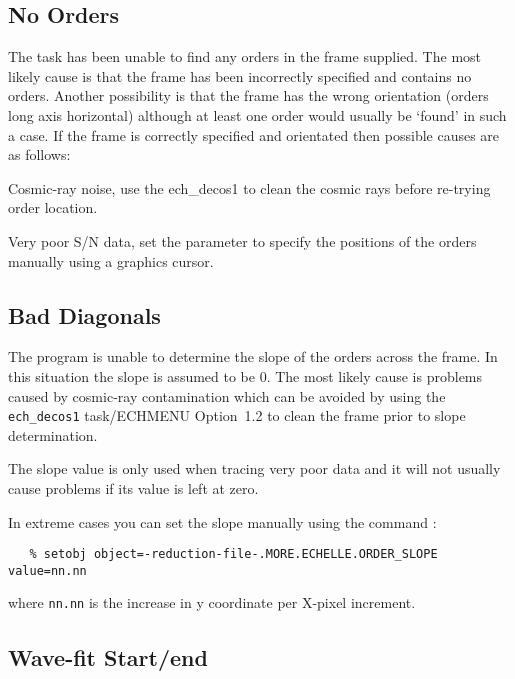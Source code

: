 \subsection{ No Orders}

The task has been unable to find any orders in the frame supplied. The
most likely cause is that the frame has been incorrectly specified and
contains no orders. Another possibility is that the frame has the wrong
orientation (orders long axis horizontal) although at least one order
would usually be `found' in such a case. If the frame is correctly
specified and orientated then possible causes are as follows:

Cosmic-ray noise, use the 
{ech_decos1} to
clean the cosmic rays before re-trying order location.

Very poor S/N data, set the parameter
 to specify the
positions of the orders manually using a graphics cursor.

\subsection{ Bad Diagonals}

The program is unable to determine the slope of the orders across the
frame. In this situation the slope is assumed to be 0. The most likely
cause is problems caused by cosmic-ray contamination which can be
avoided by using the \verb+ech_decos1+ task/ECHMENU Option~1.2 to clean the
frame prior to slope determination.

The slope value is only used when tracing very poor data and it will not
usually cause problems if its value is left at zero.

In extreme cases you can set the slope manually using the
 command :

\begin{verbatim}
   % setobj object=-reduction-file-.MORE.ECHELLE.ORDER_SLOPE value=nn.nn
\end{verbatim}

where {\tt nn.nn} is the increase in y coordinate per X-pixel increment.

\subsection{ Wave-fit Start/end}

